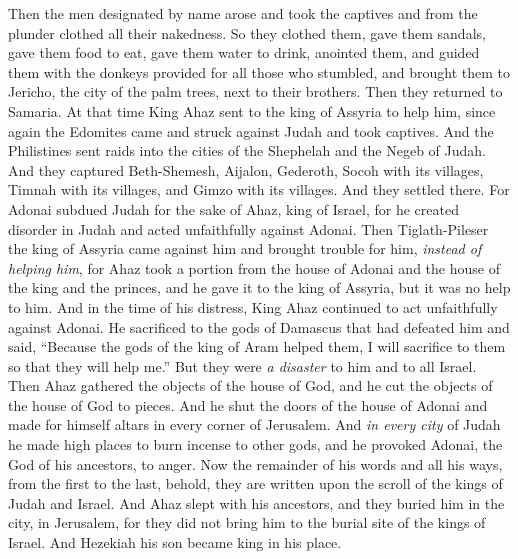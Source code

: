 \begin{biblechapter}
\verse Then the men designated by name arose and took the captives and from the plunder clothed all their nakedness. So they clothed them, gave them sandals, gave them food to eat, gave them water to drink, anointed them, and guided them with the donkeys provided for all those who stumbled, and brought them to Jericho, the city of the palm trees, next to their brothers. Then they returned to Samaria.
\verse At that time King Ahaz sent to the king of Assyria to help him,
\verse since again the Edomites came and struck against Judah and took captives.
\verse And the Philistines sent raids into the cities of the Shephelah and the Negeb of Judah. And they captured Beth-Shemesh, Aijalon, Gederoth, Socoh with its villages, Timnah with its villages, and Gimzo with its villages. And they settled there.
\verse For Adonai subdued Judah for the sake of Ahaz, king of Israel, for he created disorder in Judah and acted unfaithfully against Adonai.
\verse Then Tiglath-Pileser the king of Assyria came against him and brought trouble for him, \textit{instead of helping him},
\verse for Ahaz took a portion from the house of Adonai and the house of the king and the princes, and he gave it to the king of Assyria, but it was no help to him.
\verse And in the time of his distress, King Ahaz continued to act unfaithfully against Adonai.
\verse He sacrificed to the gods of Damascus that had defeated him and said, “Because the gods of the king of Aram helped them, I will sacrifice to them so that they will help me.” But they were \textit{a disaster} to him and to all Israel.
\verse Then Ahaz gathered the objects of the house of God, and he cut the objects of the house of God to pieces. And he shut the doors of the house of Adonai and made for himself altars in every corner of Jerusalem.
\verse And \textit{in every city} of Judah he made high places to burn incense to other gods, and he provoked Adonai, the God of his ancestors, to anger.
\verse Now the remainder of his words and all his ways, from the first to the last, behold, they are written upon the scroll of the kings of Judah and Israel.
\verse And Ahaz slept with his ancestors, and they buried him in the city, in Jerusalem, for they did not bring him to the burial site of the kings of Israel. And Hezekiah his son became king in his place.
\end{biblechapter}

